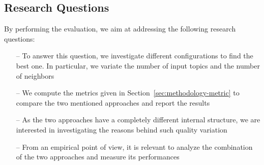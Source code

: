 \subsection{Research Questions} \label{sec:ResearchQuestions}
By performing the evaluation, we aim at addressing the following research questions:
\begin{itemize}
\item[--] \rqfirst To answer this question, we investigate different configurations to find the best one. In particular, we variate the number of input topics and the number of neighbors 
\item[--] \rqsecond We compute the metrics given in Section~\ref{sec:methodology-metric} to compare the two mentioned approaches and report the results
\item[--] \rqthird As the two approaches have a completely different internal structure, we are interested in investigating the reasons behind such quality variation
\item[--] \rqfourth From an empirical point of view, it is relevant to analyze the combination of the two approaches and measure its performances
\end{itemize}


